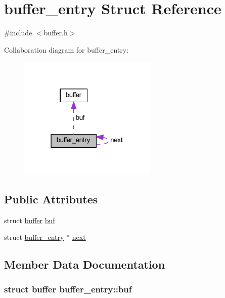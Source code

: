 \hypertarget{structbuffer__entry}{}\section{buffer\+\_\+entry Struct Reference}
\label{structbuffer__entry}


{\ttfamily \#include $<$buffer.\+h$>$}



Collaboration diagram for buffer\+\_\+entry\+:
\nopagebreak
\begin{figure}[H]
\begin{center}
\leavevmode
\includegraphics[width=187pt]{structbuffer__entry__coll__graph}
\end{center}
\end{figure}
\subsection*{Public Attributes}
\begin{DoxyCompactItemize}
\item 
struct \hyperlink{structbuffer}{buffer} \hyperlink{structbuffer__entry_ade29481cb1d1354ad2b22ff5510e285b}{buf}
\item 
struct \hyperlink{structbuffer__entry}{buffer\+\_\+entry} $\ast$ \hyperlink{structbuffer__entry_a26b1c9d47a4329655cccf3916631b247}{next}
\end{DoxyCompactItemize}


\subsection{Member Data Documentation}
\hypertarget{structbuffer__entry_ade29481cb1d1354ad2b22ff5510e285b}{}
\subsubsection[{buf}]{\setlength{\rightskip}{0pt plus 5cm}struct {\bf buffer} buffer\+\_\+entry\+::buf}\label{structbuffer__entry_ade29481cb1d1354ad2b22ff5510e285b}
\hypertarget{structbuffer__entry_a26b1c9d47a4329655cccf3916631b247}{}
